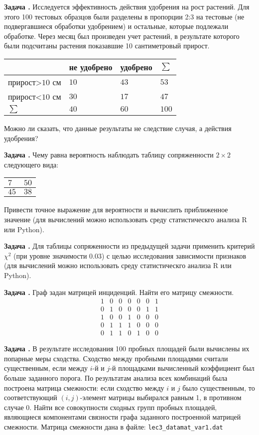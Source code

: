 \documentclass[12pt, a4paper]{article}
\newcounter{tasknum}
\newcommand{\task}{\addtocounter{tasknum}{1}
\textbf{Задача \arabic{tasknum}.\,\,}}
\begin{document}
\task Исследуется эффективность действия удобрения на рост растений. Для этого 100 тестовых образцов 
были разделены в пропорции 2:3 на тестовые (не подвергавшиеся обработки удобрением) и остальные, которые
подлежали обработке. Через месяц был произведен  учет растений, в результате которого были подсчитаны растения
показавшие 10 сантиметровый прирост.
\begin{tabular}{l|l|l|l}
&  не удобрено & удобрено & $\sum$ \\ \hline
прирост>$10$ см & $10$ & $43$ & $53$ \\\hline
прирост<$10$ см & $30$ & $17$ & $47$ \\\hline
$\sum$ & $40$ & $60$ & $100$
\end{tabular}
Можно ли сказать, что данные результаты не следствие случая, а действия удобрения?



\task Чему равна вероятность наблюдать таблицу сопряженности $2\times 2$ следующего вида:
\begin{table}[H]
\centering
\begin{tabular}{l|l|}
$7$ & $50$  \\\hline
$45$ & $38$ \\\hline
\end{tabular}
\end{table}
Привести точное выражение для вероятности и вычислить приближенное значение 
(для вычислений можно использовать среду статистическго анализа R или Python).


\task Для таблицы сопряженности из предыдущей задачи применить критерий $\chi^2$ (при уровне значимости $0.03$)
с целью исследования зависимости признаков
(для вычислений можно использовать среду статистическго анализа R или Python).


\task Граф задан матрицей инциденций. Найти его матрицу смежности.
$$
\begin{array}{lllllll}
1 & 0 & 0 & 0 & 0 & 0 & 1 \\
0 & 1 & 0 & 0 & 0 & 1 & 1 \\
1 & 0 & 0 & 1 & 0 & 0 & 0 \\
0 & 1 & 1 & 1 & 0 & 0 & 0 \\
0 & 1 & 1 & 0 & 1 & 0 & 0 
\end{array}
$$

\task В результате исследования 100 пробных площадей были вычислены их попарные меры сходства. 
Сходство между пробными площадями считали существенным, если между $i$-й и $j$-й площадками
вычисленный коэффициент был больше заданного порога. По результатам анализа всех комбинаций была
построена матрица смежности: если сходство между $i$ и $j$ было существенным, то соответствующий $(i,j)$-элемент
матрицы выбирался равным 1, в противном случае 0. Найти все совокупности сходных групп пробных площадей, являющиеся
компонентами связности графа заданного построенной матрицей смежности. Матрица смежности дана в файле: 
\texttt{lec3_datamat_var1.dat}
\end{document}
